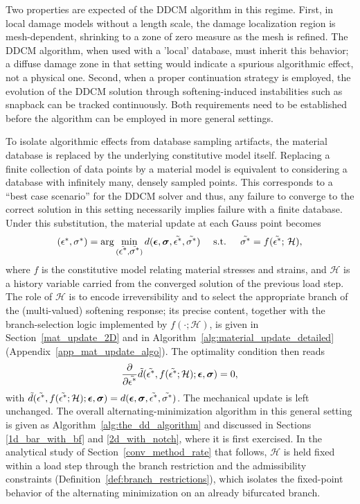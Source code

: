 \documentclass[10pt,review]{cas-sc}
\begin{document}
Two properties are expected of the DDCM algorithm in this regime. First, in local damage models without a length scale, the damage localization region is mesh-dependent, shrinking to a zone of zero measure as the mesh is refined. The DDCM algorithm, when used with a 'local' database, must inherit this behavior; a diffuse damage zone in that setting would indicate a spurious algorithmic effect, not a physical one. Second, when a proper continuation strategy is employed, the evolution of the DDCM solution through softening-induced instabilities such as snapback can be tracked continuously. Both requirements need to be established before the algorithm can be employed in more general settings.


To isolate algorithmic effects from database sampling artifacts, the material database is replaced by the underlying constitutive model itself. Replacing a finite collection of data points by a material model is equivalent to considering a database with infinitely many, densely sampled points. This corresponds to a ``best case scenario'' for the DDCM solver and thus, any failure to converge to the correct solution in this setting necessarily implies failure with a finite database. Under this substitution, the material update at each Gauss point becomes
\begin{equation}
	(\mbox{$\epsilon^*$},\mbox{$\sigma^*$}) = \arg \min_{(\tilde{\mbox{$\epsilon^*$}},\tilde{\mbox{$\sigma^*$}})} d(\mbox{\boldmath $\epsilon$},\mbox{\boldmath $\sigma$},\tilde{\mbox{$\epsilon^*$}},\tilde{\mbox{$\sigma^*$}}) \quad \text{   s.t.   }\quad \tilde{\mbox{$\sigma^*$}}=f(\tilde{\mbox{$\epsilon^*$}};\,\mathcal{H}),
\end{equation}
where $f$ is the constitutive model relating material stresses and strains, and $\mathcal{H}$ is a history variable carried from the converged solution of the previous load step. The role of $\mathcal{H}$ is to encode irreversibility and to select the appropriate branch of the (multi-valued) softening response; its precise content, together with the branch-selection logic implemented by $f(\cdot;\mathcal{H})$, is given in Section~\ref{mat_update_2D} and in Algorithm~\ref{alg:material_update_detailed} (Appendix~\ref{app_mat_update_algo}). The optimality condition then reads
\begin{equation}
	{\dfrac{\partial }{\partial \tilde{ \mbox{$\epsilon^*$}}}} \tilde{d}(\tilde{\mbox{$\epsilon^*$}},f(\tilde{\mbox{$\epsilon^*$}};\mathcal{H});\mbox{\boldmath $\epsilon$},\mbox{\boldmath $\sigma$})    =0,
\end{equation}
with $\tilde{d}(\tilde{\mbox{$\epsilon^*$}},f(\tilde{\mbox{$\epsilon^*$}};\mathcal{H});\mbox{\boldmath $\epsilon$},\mbox{\boldmath $\sigma$}) = d(\mbox{\boldmath $\epsilon$},\mbox{\boldmath $\sigma$},\tilde{\mbox{$\epsilon^*$}},\tilde{\mbox{$\sigma^*$}})$. The mechanical update is left unchanged. The overall alternating-minimization algorithm in this general setting is given as Algorithm~\ref{alg:the_dd_algorithm} and discussed in Sections \ref{1d_bar_with_bf} and \ref{2d_with_notch}, where it is first exercised. In the analytical study of Section~\ref{conv_method_rate} that follows, $\mathcal{H}$ is held fixed within a load step through the branch restriction and the admissibility constraints (Definition~\ref{def:branch_restrictions}), which isolates the fixed-point behavior of the alternating minimization on an already bifurcated branch.
\end{document}
